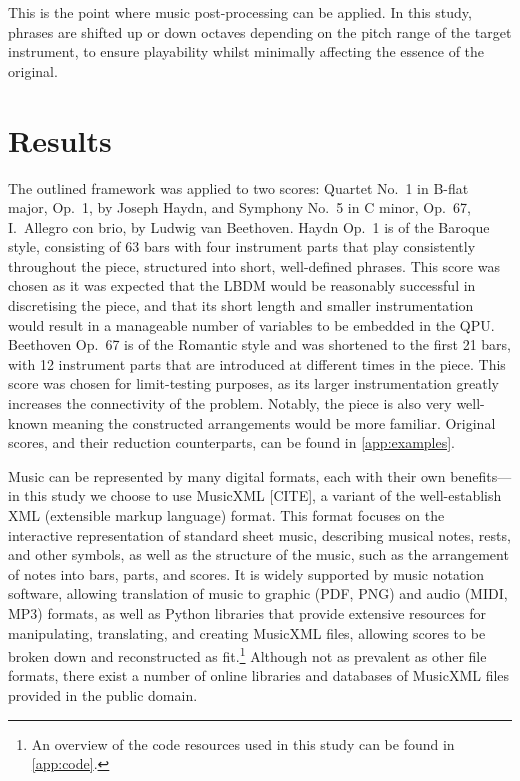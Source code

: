 \documentclass[12pt]{article}
\theoremstyle{definition}
\begin{document}
This is the point where music post-processing can be applied. In this study, phrases are shifted up or down octaves depending on the pitch range of the target instrument, to ensure playability whilst minimally affecting the essence of the original.

\section{Results}

The outlined framework was applied to two scores: Quartet No.\ 1 in B-flat major, Op.\ 1, by Joseph Haydn, and Symphony No.\ 5 in C minor, Op.\ 67, I.\ Allegro con brio, by Ludwig van Beethoven. Haydn Op.\ 1 is of the Baroque style, consisting of 63 bars with four instrument parts that play consistently throughout the piece, structured into short, well-defined phrases. This score was chosen as it was expected that the LBDM would be reasonably successful in discretising the piece, and that its short length and smaller instrumentation would result in a manageable number of variables to be embedded in the QPU. Beethoven Op.\ 67 is of the Romantic style and was shortened to the first 21 bars, with 12 instrument parts that are introduced at different times in the piece. This score was chosen for limit-testing purposes, as its larger instrumentation greatly increases the connectivity of the problem. Notably, the piece is also very well-known meaning the constructed arrangements would be more familiar.
Original scores, and their reduction counterparts, can be found in \cref{app:examples}.

Music can be represented by many digital formats, each with their own benefits---in this study we choose to use MusicXML [CITE], a variant of the well-establish XML (extensible markup language) format. This format focuses on the interactive representation of standard sheet music, describing musical notes, rests, and other symbols, as well as the structure of the music, such as the arrangement of notes into bars, parts, and scores. It is widely supported by music notation software, allowing translation of music to graphic (PDF, PNG) and audio (MIDI, MP3) formats, as well as Python libraries that provide extensive resources for manipulating, translating, and creating MusicXML files, allowing scores to be broken down and reconstructed as fit.\footnote{An overview of the code resources used in this study can be found in \cref{app:code}.} Although not as prevalent as other file formats, there exist a number of online libraries and databases of MusicXML files provided in the public domain.
\end{document}
